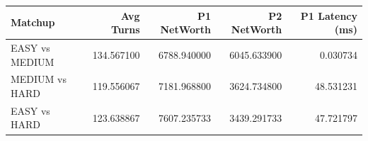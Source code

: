 \begin{tabular}{lrrrr}
\toprule
Matchup & Avg Turns & P1 NetWorth & P2 NetWorth & P1 Latency (ms) \\
\midrule
EASY vs MEDIUM & 134.567100 & 6788.940000 & 6045.633900 & 0.030734 \\
MEDIUM vs HARD & 119.556067 & 7181.968800 & 3624.734800 & 48.531231 \\
EASY vs HARD & 123.638867 & 7607.235733 & 3439.291733 & 47.721797 \\
\bottomrule
\end{tabular}
